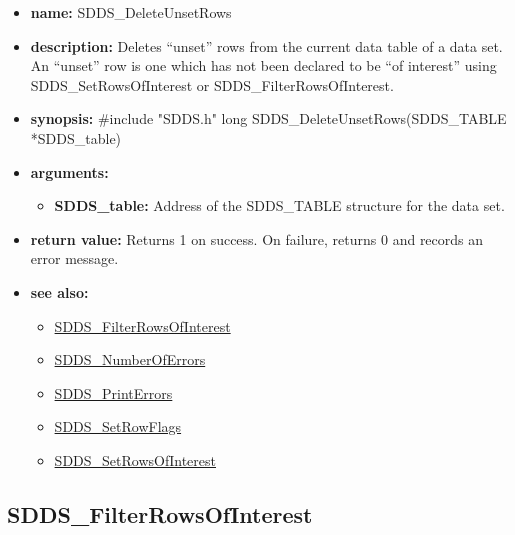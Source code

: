 \documentclass[11pt]{article}
\newcommand{\progref}[1]{\hyperref{SDDS_#1}{{\tt SDDS\_#1} (}{)}{SDDS_#1}}
\begin{document}
\begin{itemize}
\item {\bf name:}\newline
SDDS\_DeleteUnsetRows
\item {\bf description:}\newline
Deletes ``unset'' rows from the current data table of a data set. An ``unset'' row is one which has not been declared to be ``of interest'' using SDDS\_SetRowsOfInterest or SDDS\_FilterRowsOfInterest.
\item {\bf synopsis:} \#include "SDDS.h"\newline
long SDDS\_DeleteUnsetRows(SDDS\_TABLE *SDDS\_table)
\item {\bf arguments:}
\begin{itemize}
\item {\bf SDDS\_table:} Address of the SDDS\_TABLE structure for the data set.
\end{itemize}
\item {\bf return value:}\newline
Returns 1 on success. On failure, returns 0 and records an error message.
\item {\bf see also:}
\begin{itemize}
\item \progref{FilterRowsOfInterest}
\item \progref{NumberOfErrors}
\item \progref{PrintErrors}
\item \progref{SetRowFlags}
\item \progref{SetRowsOfInterest}
\end{itemize}
\end{itemize}

\subsection{SDDS\_FilterRowsOfInterest}
\label{SDDS_FilterRowsOfInterest}
\end{document}
